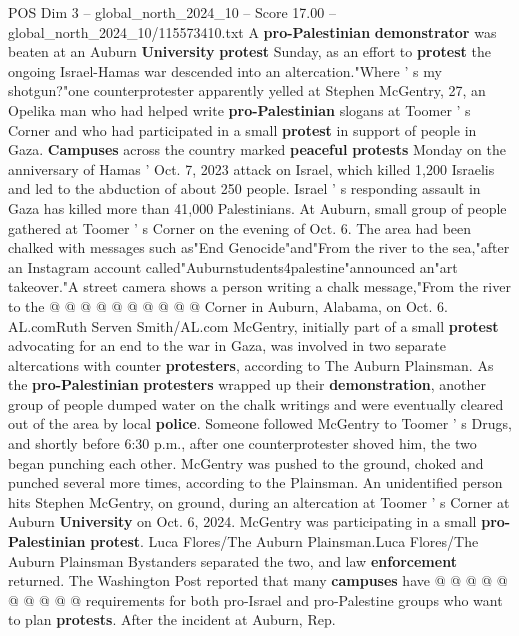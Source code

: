 \begin{textsample}{POS Dim 3 – global\_north\_2024\_10 – Score 17.00 – global\_north\_2024\_10/115573410.txt}  \label{ex:f3_pos_130}
A \textbf{pro-Palestinian} \textbf{demonstrator} was beaten at an Auburn \textbf{University} \textbf{protest} Sunday, as an effort to \textbf{protest} the ongoing Israel-Hamas war descended into an altercation."Where ' s my shotgun?"one counterprotester apparently yelled at Stephen McGentry, 27, an Opelika man who had helped write \textbf{pro-Palestinian} slogans at Toomer ' s Corner and who had participated in a small \textbf{protest} in support of people in Gaza. \textbf{Campuses} across the country marked \textbf{peaceful} \textbf{protests} Monday on the anniversary of Hamas ' Oct. 7, 2023 attack on Israel, which killed 1,200 Israelis and led to the abduction of about 250 people.
Israel ' s responding assault in Gaza has killed more than 41,000 Palestinians.
At Auburn, small group of people gathered at Toomer ' s Corner on the evening of Oct. 6.
The area had been chalked with messages such as"End Genocide"and"From the river to the sea,"after an Instagram account called"Auburnstudents4palestine"announced an"art takeover."A street camera shows a person writing a chalk message,"From the river to the @ @ @ @ @ @ @ @ @ @ Corner in Auburn, Alabama, on Oct. 6.
AL.comRuth Serven Smith/AL.com McGentry, initially part of a small \textbf{protest} advocating for an end to the war in Gaza, was involved in two separate altercations with counter \textbf{protesters}, according to The Auburn Plainsman.
As the \textbf{pro-Palestinian} \textbf{protesters} wrapped up their \textbf{demonstration}, another group of people dumped water on the chalk writings and were eventually cleared out of the area by local \textbf{police}.
Someone followed McGentry to Toomer ' s Drugs, and shortly before 6:30 p.m., after one counterprotester shoved him, the two began punching each other.
McGentry was pushed to the ground, choked and punched several more times, according to the Plainsman.
An unidentified person hits Stephen McGentry, on ground, during an altercation at Toomer ' s Corner at Auburn \textbf{University} on Oct. 6, 2024.
McGentry was participating in a small \textbf{pro-Palestinian} \textbf{protest}.
Luca Flores/The Auburn Plainsman.Luca Flores/The Auburn Plainsman Bystanders separated the two, and law \textbf{enforcement} returned.
The Washington Post reported that many \textbf{campuses} have @ @ @ @ @ @ @ @ @ @ requirements for both pro-Israel and pro-Palestine groups who want to plan \textbf{protests}.
After the incident at Auburn, Rep.

\end{textsample}
